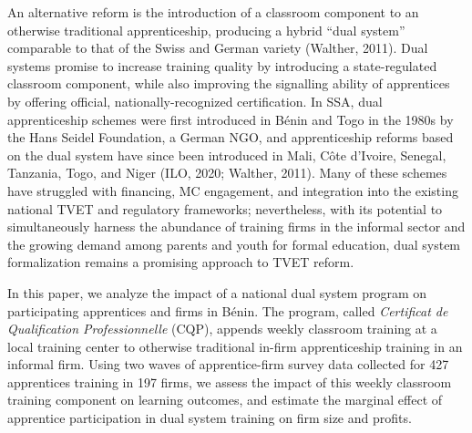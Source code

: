 \documentclass[
  11pt,
a4paper
]{report}
\begin{document}
An alternative reform is the introduction of a classroom component to an otherwise traditional apprenticeship, producing a hybrid ``dual system'' comparable to that of the Swiss and German variety (Walther, 2011). Dual systems promise to increase training quality by introducing a state-regulated classroom component, while also improving the signalling ability of apprentices by offering official, nationally-recognized certification. In SSA, dual apprenticeship schemes were first introduced in Bénin and Togo in the 1980s by the Hans Seidel Foundation, a German NGO, and apprenticeship reforms based on the dual system have since been introduced in Mali, Côte d'Ivoire, Senegal, Tanzania, Togo, and Niger (ILO, 2020; Walther, 2011). Many of these schemes have struggled with financing, MC engagement, and integration into the existing national TVET and regulatory frameworks; nevertheless, with its potential to simultaneously harness the abundance of training firms in the informal sector and the growing demand among parents and youth for formal education, dual system formalization remains a promising approach to TVET reform.

In this paper, we analyze the impact of a national dual system program on participating apprentices and firms in Bénin. The program, called \emph{Certificat de Qualification Professionnelle} (CQP), appends weekly classroom training at a local training center to otherwise traditional in-firm apprenticeship training in an informal firm. Using two waves of apprentice-firm survey data collected for 427 apprentices training in 197 firms, we assess the impact of this weekly classroom training component on learning outcomes, and estimate the marginal effect of apprentice participation in dual system training on firm size and profits.
\end{document}

